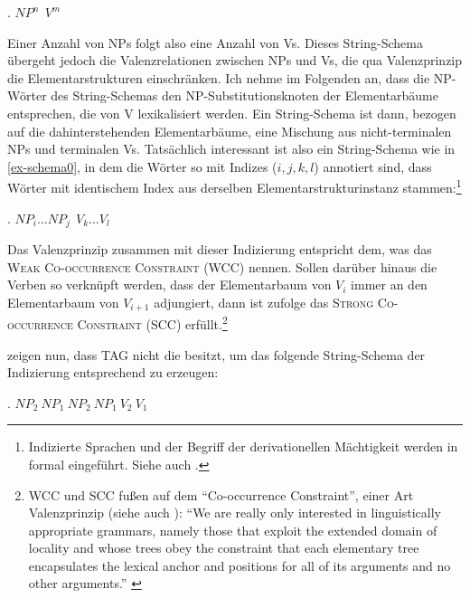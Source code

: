 \ex. $\mathit{NP}^n ~~ V^m$

Einer Anzahl von NPs folgt also eine Anzahl von Vs. Dieses String-Schema übergeht jedoch die Valenzrelationen zwischen NPs und Vs, die qua Valenzprinzip die Elementarstrukturen einschränken. Ich nehme im Folgenden an, dass die NP-Wörter des String-Schemas den NP-Substitutionsknoten der Elementarbäume entsprechen, die von V lexikalisiert werden. Ein String-Schema ist dann, bezogen auf die dahinterstehenden Elementarbäume, eine Mischung aus nicht-terminalen NPs und terminalen Vs. Tatsächlich interessant ist also ein String-Schema wie in \ref{ex-schema0}, in dem die Wörter so mit Indizes ($i,j,k,l$) annotiert sind, dass Wörter mit identischem Index aus derselben Elementarstrukturinstanz stammen:\footnote{Indizierte Sprachen und der Begriff der derivationellen Mächtigkeit werden in \cite{Becker:Rambow:Niv:92} formal eingeführt. Siehe auch \citet[41]{Rambow:94}.}

\ex. $\mathit{NP}_i \ldots \mathit{NP}_j ~~ V_k \ldots V_l$ \label{ex-schema0}   

Das  Valenzprinzip zusammen mit dieser Indizierung entspricht dem, was \citet[175]{Joshi:Becker:Rambow:00} das \textsc{Weak Co-occurrence Constraint (WCC)} nennen. Sollen darüber hinaus die  Verben so verknüpft werden, dass der Elementarbaum von $V_i$ immer an den Elementarbaum von $V_{i+1}$ adjungiert, dann ist \citet[177]{Joshi:Becker:Rambow:00} zufolge das \textsc{Strong Co-occurrence Constraint (SCC)} erfüllt.\footnote{\label{fn-wcc-scc}WCC und SCC fu\ss en auf dem "`Co-occurrence Constraint"', einer Art Valenzprinzip (siehe auch \citealt[22]{Becker:Joshi:Rambow:91}): "`We are really only interested in linguistically appropriate grammars, namely those that exploit the extended domain of locality and whose trees obey the constraint that each elementary tree encapsulates the lexical anchor and positions for all of its arguments and no other arguments."' \citep[175]{Joshi:Becker:Rambow:00}} %

\cite{Becker:Joshi:Rambow:91} zeigen nun, dass TAG nicht die  besitzt, um das folgende String-Schema der Indizierung entsprechend zu erzeugen:

\ex. $\mathit{NP}_2 ~ \mathit{NP}_1 ~ \mathit{NP}_2 ~ \mathit{NP}_1 ~ V_2 ~ V_1$ \label{ex-schema1}

